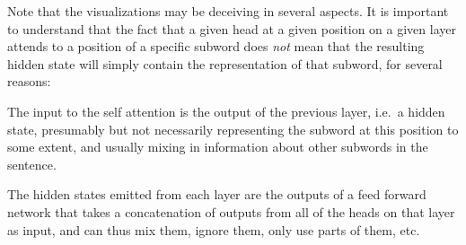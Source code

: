 \documentclass[11pt,a4paper]{article}
\newcommand\ie{i.e.\ }
\def\JL#1{{\color{magenta}JL: \it #1}}
\def\DEL#1{{\color{green}SMAZAT: \it #1}}
\def\JL#1{}
\def\DEL#1{}
\begin{document}

Note that the visualizations may be deceiving in several aspects.
It is important to understand that the fact that a given head at a given position on a given layer attends to a position of a specific subword does \emph{not} mean that the resulting hidden state will simply contain the representation of that subword, for several reasons:
%
\begin{compactitem}
\item The input to the self attention is the output of the previous layer, \ie a hidden state, presumably but not necessarily representing the subword at this position to some extent, and usually mixing in information about other subwords in the sentence.
\DEL{\item The Transformer self-attention mechanism does not apply the attention weights directly to the input states, but rather to the so-called \emph{values} of the states, obtained via a linear transformation}
\DEL{\item The output of the self-attention is averaged with the state from the previous layer through residual connections}
\item The hidden states emitted from each layer are the outputs of a feed forward network that takes a concatenation of outputs from all of the heads on that layer as input, and can thus mix them, ignore them, only use parts of them, etc.
\end{compactitem}
%
\end{document}
